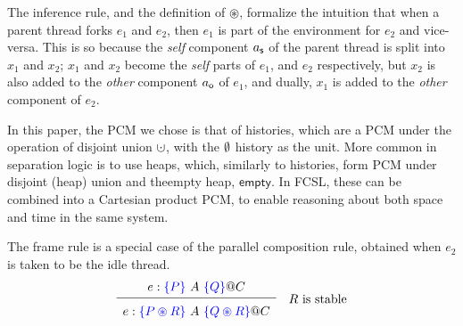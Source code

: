 The inference rule, and the definition of $\circledast$, formalize the
intuition that when a parent thread forks $e_1$ and $e_2$, then $e_1$
is part of the environment for $e_2$ and vice-versa. This is so
because the \emph{self} component $a_{\mathsf{s}}$ of the parent thread is
split into $x_1$ and $x_2$; $x_1$ and $x_2$ become the \emph{self}
parts of $e_1$, and $e_2$ respectively, but $x_2$ is also added to the
\emph{other} component $a_{\mathsf{o}}$ of $e_1$, and dually, $x_1$ is added
to the \emph{other} component of $e_2$.

In this paper, the PCM we chose is that of histories, which are a PCM
under the operation of disjoint union $\hunion$, with the $\emptyset$
history as the unit. More common in separation logic is to use heaps,
which, similarly to histories, form PCM under disjoint (heap) union
and theempty heap, $\mathsf{empty}$. In FCSL, these can be combined
into a Cartesian product PCM, to enable reasoning about both space and
time in the same system.


The frame rule is a special case of the parallel composition rule,
obtained when $e_2$ is taken to be the idle thread.
\[
\hfill \begin{array}{c}
e : \specK{\{P\}}\ A\ \specK{\{Q\}} @ C\\[2pt]
\hline\\[-7pt]
e : \specK{\{P \circledast R\}}\ A\ \specK{\{Q \circledast R\}} @ C 
\end{array}  \quad \mbox{$R$ is stable} \hfill
\]

